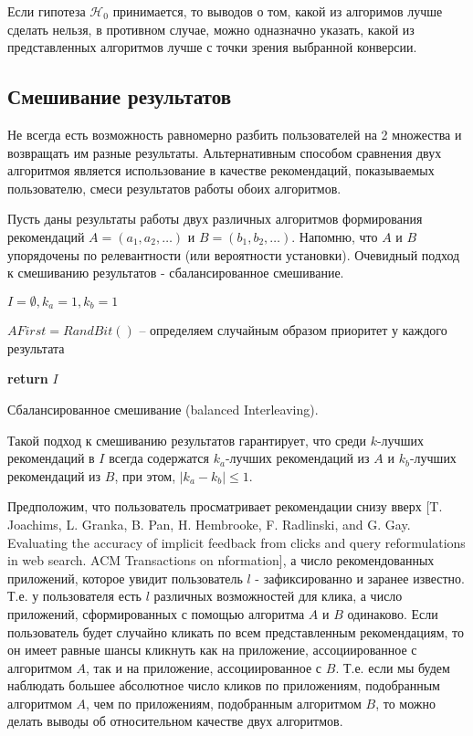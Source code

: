 \documentclass[12pt,a4paper]{report}
\begin{document}
Если гипотеза $\mathcal{H}_0$ принимается, то выводов о том, какой из алгоримов лучше сделать нельзя, в противном случае, можно одназначно указать, какой из представленных алгоритмов лучше с точки зрения выбранной конверсии.

\subsection{Смешивание результатов}
Не всегда есть возможность равномерно разбить пользователей на 2 множества и возвращать им разные результаты. Альтернативным способом сравнения двух алгоритмоя является использование в качестве рекомендаций, показываемых пользователю, смеси результатов работы обоих алгоритмов.

Пусть даны результаты работы двух различных алгоритмов формирования рекомендаций $A = (a_1, a_2, \dots)$ и $B = (b_1, b_2, \dots)$. Напомню, что $A$ и $B$ упорядочены по релевантности (или вероятности установки). Очевидный подход к смешиванию результатов - сбалансированное смешивание.

\begin{algorithm}[H]
\SetAlgoLined
{}
$I = \emptyset, k_a = 1, k_b = 1$

$AFirst = RandBit()$ -- определяем случайным образом приоритет у каждого результата

\textbf{return} $I$
\caption{Сбалансированное смешивание (balanced Interleaving).}
\label{alg:BI}
\end{algorithm}

Такой подход к смешиванию результатов гарантирует, что среди $k$-лучших рекомендаций в $I$ всегда содержатся $k_a$-лучших рекомендаций из $A$ и $k_b$-лучших рекомендаций из $B$, при этом, $|k_a-k_b| \le 1$.

Предположим, что пользователь просматривает рекомендации снизу вверх [T. Joachims, L. Granka, B. Pan, H. Hembrooke, F. Radlinski, and G. Gay. Evaluating the accuracy of implicit feedback from clicks and query reformulations in web search. ACM Transactions on nformation], а число рекомендованных приложений, которое увидит пользователь $l$ - зафиксированно и заранее известно. Т.е. у пользователя есть $l$ различных возможностей для клика, а число приложений, сформированных с помощью алгоритма $A$ и $B$ одинаково. Если пользователь будет случайно кликать по всем представленным рекомендациям, то он имеет равные шансы кликнуть как на приложение, ассоциированное с алгоритмом $A$, так и на приложение, ассоциированное с $B$. Т.е. если мы будем наблюдать большее абсолютное число кликов по приложениям, подобранным алгоритмом $A$, чем по приложениям, подобранным алгоритмом $B$, то можно делать выводы об относительном качестве двух алгоритмов.
\end{document}
